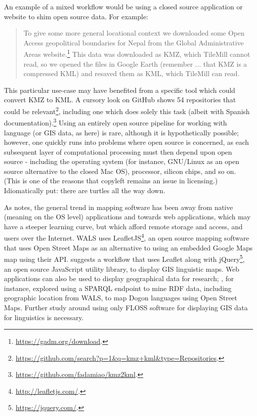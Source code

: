 An example of a mixed workflow would be using a closed source application or website to shim open source data. For example:

\begin{quote}
To give some more general locational context we downloaded some Open Access geopolitical boundaries for Nepal from the Global Administrative Areas website.\footnote{\href{https://gadm.org/download}{https://gadm.org/download}. } This data was downloaded as KMZ, which TileMill cannot read, so we opened the files in Google Earth (remember ... that KMZ is a compressed KML) and resaved them as KML, which TileMill can read. \citep[228]{gawne2016mapmaking}
\end{quote}

This particular use-case may have benefited from a specific tool which could convert KMZ to KML. A cursory look on GitHub shows 54 repositories that could be relevant\footnote{\href{https://github.com/search?p=1&q=kmz+kml&type=Repositories}{https://github.com/search?p=1\&q=kmz+kml\&type=Repositories}. }, including one which does solely this task (albeit with Spanish documentation).\footnote{\href{https://github.com/fadamiao/kmz2kml}{https://github.com/fadamiao/kmz2kml}. } Using an entirely open source pipeline for working with language (or GIS data, as here) is rare, although it is hypothetically possible; however, one quickly runs into problems where open source is concerned, as each subsequent layer of computational processing must then depend upon open source - including the operating system (for instance, GNU/Linux as an open source alternative to the closed Mac OS), processor, silicon chips, and so on. (This is one of the reasons that copyleft remains an issue in licensing.) Idiomatically put: there are turtles all the way down.

As \citet{hu2012multimedia, hu2018web} notes, the general trend in mapping software has been away from native (meaning on the OS level) applications and towards web applications, which may have a steeper learning curve, but which afford remote storage and access, and users over the Internet. WALS uses LeafletJS\footnote{\href{http://leafletjs.com/}{http://leafletjs.com/}. }, an open source mapping software that uses Open Street Maps as an alternative to using an embedded Google Maps map using their API. \citet{hu2018web} suggests a workflow that uses Leaflet along with jQuery\footnote{\href{https://jquery.com/}{https://jquery.com/}. }, an open source JavaScript utility library, to display GIS linguistic maps. Web applications can also be used to display geographical data for research; \citet{littauer2013linguistic}, for instance, explored using a SPARQL endpoint to mine RDF data, including geographic location from WALS, to map Dogon languages using Open Street Maps. Further study around using only FLOSS software for displaying GIS data for linguistics is necessary.

